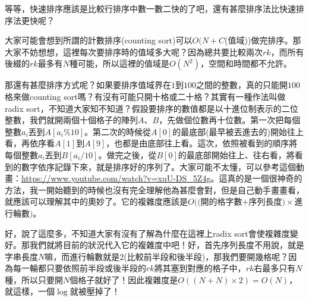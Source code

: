 		等等，快速排序應該是比較行排序中數一數二快的了吧，還有甚麼排序法比快速排序法更快呢？
		
		大家可能會想到所謂的計數排序(counting sort)可以$O(N+C$(值域))做完排序。那大家不妨想想，這裡每次要排序時的值域多大呢？因為總共要比較兩次$rk$，而所有後綴的$rk$最多有$N$種可能，所以這裡的值域是$O(N^2)$，空間和時間都不允許。
		
		那還有甚麼排序方式呢？如果要排序值域界在$1$到$100$之間的整數，真的只能開$100$格來做counting sort嗎？有沒有可能只開十格或二十格？其實有一種作法叫做radix sort，不知道大家知不知道？假設要排序的數值都是以十進位制表示的二位整數，我們就開兩個十個格子的陣列$A$、$B$，先做個位數再十位數。第一次把每個整數$a_i$丟到$A[a_i\%10]$。第二次的時候從$A[0]$的最底部(最早被丟進去的)開始往上看，再依序看$A[1]$到$A[9]$，也都是由底部往上看。這次，依照被看到的順序將每個整數$a_i$丟到$B[a_i/10]$。做完之後，從$B[0]$的最底部開始往上、往右看，將看到的數字依序記錄下來，就是排序好的序列了。大家可能不太懂，可以參考這個動畫：\url{https://www.youtube.com/watch?v=xuU-DS_5Z4g}。這真的是一個很神奇的方法，我一開始聽到的時候也沒有完全理解他為甚麼會對，但是自己動手畫畫看，就應該可以理解其中的奧妙了。它的複雜度應該是$O(($開的格字數$+$序列長度$) \times$進行輪數$)$。
		
		好，說了這麼多，不知道大家有沒有了解為什麼在這裡上radix sort會使複雜度變好。那我們就將目前的狀況代入它的複雜度中吧！好，首先序列長度不用說，就是字串長度$N$嘛，而進行輪數就是$2$(比較前半段和後半段)，那我們要開幾格呢？因為每一輪都只要依照前半段或後半段的$rk$將其塞到對應的格子中，$rk$右最多只有$N$種，所以只要開$N$個格子就好了！因此複雜度是$O((N+N) \times 2) = O(N)$，就這樣，一個$\log$就被壓掉了！
		
